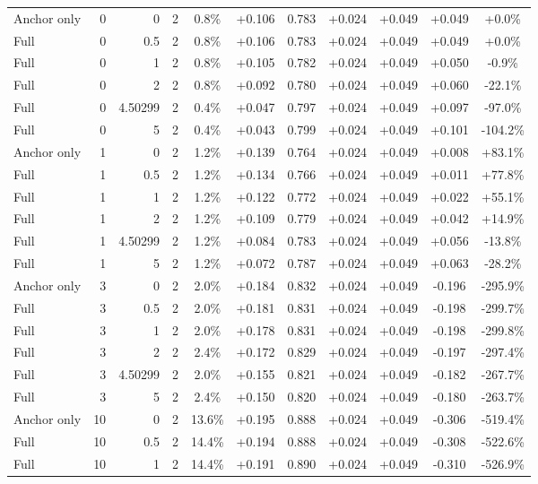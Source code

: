 \begin{table}[htbp]
\begin{tabular}{lrrrccccccc}
Anchor only & 0 & 0 & 2 & 0.8\% & +0.106 & 0.783 & +0.024 & +0.049 & +0.049 & +0.0\% \\
Full & 0 & 0.5 & 2 & 0.8\% & +0.106 & 0.783 & +0.024 & +0.049 & +0.049 & +0.0\% \\
Full & 0 & 1 & 2 & 0.8\% & +0.105 & 0.782 & +0.024 & +0.049 & +0.050 & -0.9\% \\
Full & 0 & 2 & 2 & 0.8\% & +0.092 & 0.780 & +0.024 & +0.049 & +0.060 & -22.1\% \\
Full & 0 & 4.50299 & 2 & 0.4\% & +0.047 & 0.797 & +0.024 & +0.049 & +0.097 & -97.0\% \\
Full & 0 & 5 & 2 & 0.4\% & +0.043 & 0.799 & +0.024 & +0.049 & +0.101 & -104.2\% \\
Anchor only & 1 & 0 & 2 & 1.2\% & +0.139 & 0.764 & +0.024 & +0.049 & +0.008 & +83.1\% \\
Full & 1 & 0.5 & 2 & 1.2\% & +0.134 & 0.766 & +0.024 & +0.049 & +0.011 & +77.8\% \\
Full & 1 & 1 & 2 & 1.2\% & +0.122 & 0.772 & +0.024 & +0.049 & +0.022 & +55.1\% \\
Full & 1 & 2 & 2 & 1.2\% & +0.109 & 0.779 & +0.024 & +0.049 & +0.042 & +14.9\% \\
Full & 1 & 4.50299 & 2 & 1.2\% & +0.084 & 0.783 & +0.024 & +0.049 & +0.056 & -13.8\% \\
Full & 1 & 5 & 2 & 1.2\% & +0.072 & 0.787 & +0.024 & +0.049 & +0.063 & -28.2\% \\
Anchor only & 3 & 0 & 2 & 2.0\% & +0.184 & 0.832 & +0.024 & +0.049 & -0.196 & -295.9\% \\
Full & 3 & 0.5 & 2 & 2.0\% & +0.181 & 0.831 & +0.024 & +0.049 & -0.198 & -299.7\% \\
Full & 3 & 1 & 2 & 2.0\% & +0.178 & 0.831 & +0.024 & +0.049 & -0.198 & -299.8\% \\
Full & 3 & 2 & 2 & 2.4\% & +0.172 & 0.829 & +0.024 & +0.049 & -0.197 & -297.4\% \\
Full & 3 & 4.50299 & 2 & 2.0\% & +0.155 & 0.821 & +0.024 & +0.049 & -0.182 & -267.7\% \\
Full & 3 & 5 & 2 & 2.4\% & +0.150 & 0.820 & +0.024 & +0.049 & -0.180 & -263.7\% \\
Anchor only & 10 & 0 & 2 & 13.6\% & +0.195 & 0.888 & +0.024 & +0.049 & -0.306 & -519.4\% \\
Full & 10 & 0.5 & 2 & 14.4\% & +0.194 & 0.888 & +0.024 & +0.049 & -0.308 & -522.6\% \\
Full & 10 & 1 & 2 & 14.4\% & +0.191 & 0.890 & +0.024 & +0.049 & -0.310 & -526.9\% \\

\end{tabular}
\end{table}
